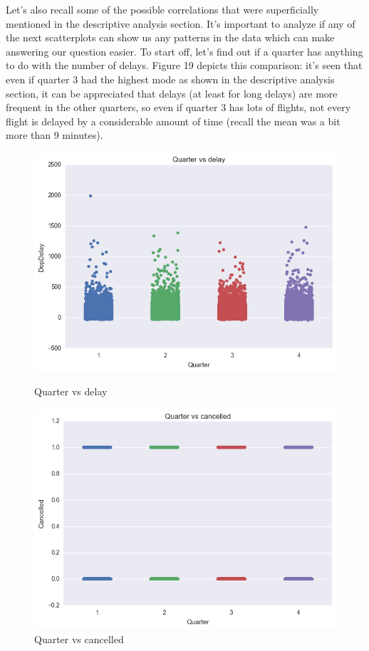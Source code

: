 \documentclass{article}
\begin{document}
    \indent Let's also recall some of the possible correlations that were superficially mentioned in the descriptive analysis section. It's important to analyze if any of the next scatterplots can show us any patterns in the data which can make answering our question easier. To start off, let's find out if a quarter has anything to do with the number of delays. Figure 19 depicts this comparison: it's seen that even if quarter 3 had the highest mode as shown in the descriptive analysis section, it can be appreciated that delays (at least for long delays) are more frequent in the other quarters, so even if quarter 3 has lots of flights, not every flight is delayed by a considerable amount of time (recall the mean was a bit more than 9 minutes).

    \begin{figure}
      \includegraphics[width=\linewidth]{graph/quarter_vs_delay.png}
      \caption{Quarter vs delay}
      \label{fig:graph1}
      \includegraphics[width=\linewidth]{graph/quarter_vs_cancelled.png}
      \caption{Quarter vs cancelled}
      \label{fig:graph1}
    \end{figure}
\end{document}
